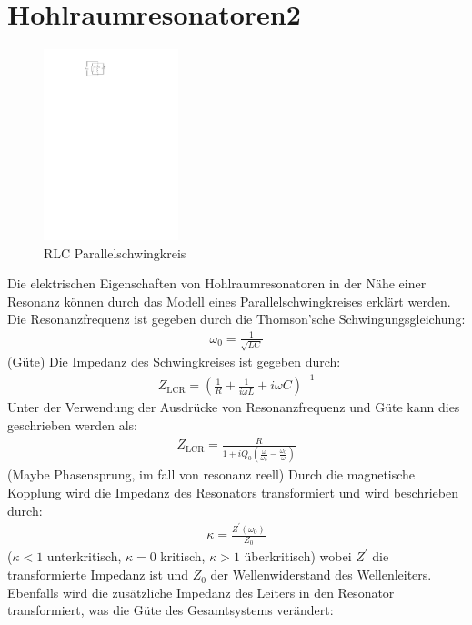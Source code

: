 \documentclass[11pt, a4paper]{scrbook}
\begin{document}
	\section{Hohlraumresonatoren2}
	\begin{figure}[h]
		\centering
		\includegraphics[width=0.35\textwidth]{./figures/RLC_circuit.pdf}
		\caption{RLC Parallelschwingkreis}
		\label{fig:rlc_circuit}
	\end{figure}
	Die elektrischen Eigenschaften von Hohlraumresonatoren in der Nähe einer Resonanz können durch das Modell eines Parallelschwingkreises erklärt werden.
	Die Resonanzfrequenz ist gegeben durch die Thomson'sche Schwingungsgleichung:
	\begin{align}
		\omega_0 = \frac{1}{\sqrt{L C}}
	\end{align}
	(Güte)
	Die Impedanz des Schwingkreises ist gegeben durch:
	\begin{align}
		Z_\mathrm{LCR} = \left( \frac{1}{R} + \frac{1}{i \omega L} + i \omega C \right)^{-1}
	\end{align}
	Unter der Verwendung der Ausdrücke von Resonanzfrequenz und Güte kann dies geschrieben werden als:
	\begin{align}
		Z_\mathrm{LCR} = \frac{R}{1 + i Q_0 \left( \frac{\omega}{\omega_0}  - \frac{\omega_0}{\omega}\right)}
	\end{align}
	(Maybe Phasensprung, im fall von resonanz reell)
	Durch die magnetische Kopplung wird die Impedanz des Resonators transformiert und wird beschrieben durch:
	\begin{align}
		\kappa = \frac{Z^\prime(\omega_0)}{Z_0}
	\end{align}
	($\kappa < 1$ unterkritisch, $\kappa = 0$ kritisch, $\kappa > 1$ überkritisch)
	wobei $Z^\prime$ die transformierte Impedanz ist und $Z_0$ der Wellenwiderstand des Wellenleiters.
	Ebenfalls wird die zusätzliche Impedanz des Leiters in den Resonator transformiert, was die Güte des Gesamtsystems verändert:
\end{document}
